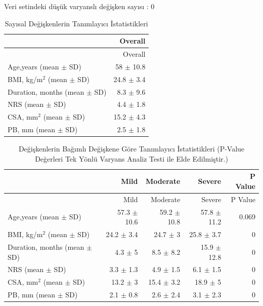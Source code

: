 \documentclass[12pt,twoside]{deuthesis}
\begin{document}
Veri setindeki düşük varyanslı değişken sayısı : 0
\begin{longtable}[]{@{}lr@{}}
\caption{\label{tab:deneme} Sayısal Değişkenlerin Tanımlayıcı İstatistikleri}\tabularnewline
\toprule
& Overall \\
\midrule
\endfirsthead
\toprule
& Overall \\
\midrule
\endhead
Age,years (mean \(\pm\) SD) & 58 \(\pm\) 10.8 \\
BMI, kg/m\(^2\) (mean \(\pm\) SD) & 24.8 \(\pm\) 3.4 \\
Duration, months (mean \(\pm\) SD) & 8.3 \(\pm\) 9.6 \\
NRS (mean \(\pm\) SD) & 4.4 \(\pm\) 1.8 \\
CSA, mm\(^2\) (mean \(\pm\) SD) & 15.2 \(\pm\) 4.3 \\
PB, mm (mean \(\pm\) SD) & 2.5 \(\pm\) 1.8 \\
\bottomrule
\end{longtable}
\begin{longtable}[]{@{}lrrrr@{}}
\caption{\label{tab:descrip} Değişkenlerin Bağımlı Değişkene Göre Tanımlayıcı İstatistikleri \tiny (P-Value Değerleri Tek Yönlü Varyans Analiz Testi ile Elde Edilmiştir.)}\tabularnewline
\toprule
& Mild & Moderate & Severe & P Value \\
\midrule
\endfirsthead
\toprule
& Mild & Moderate & Severe & P Value \\
\midrule
\endhead
Age,years (mean \(\pm\) SD) & 57.3 \(\pm\) 10.6 & 59.2 \(\pm\) 10.8 & 57.8 \(\pm\) 11.2 & 0.069 \\
BMI, kg/m\(^2\) (mean \(\pm\) SD) & 24.2 \(\pm\) 3.4 & 24.7 \(\pm\) 3 & 25.8 \(\pm\) 3.7 & 0 \\
Duration, months (mean \(\pm\) SD) & 4.3 \(\pm\) 5 & 8.5 \(\pm\) 8.2 & 15.9 \(\pm\) 12.8 & 0 \\
NRS (mean \(\pm\) SD) & 3.3 \(\pm\) 1.3 & 4.9 \(\pm\) 1.5 & 6.1 \(\pm\) 1.5 & 0 \\
CSA, mm\(^2\) (mean \(\pm\) SD) & 13.2 \(\pm\) 3 & 15.4 \(\pm\) 3.2 & 18.9 \(\pm\) 5 & 0 \\
PB, mm (mean \(\pm\) SD) & 2.1 \(\pm\) 0.8 & 2.6 \(\pm\) 2.4 & 3.1 \(\pm\) 2.3 & 0 \\
\bottomrule
\end{longtable}
\hfill\break
\hfill\break
~
\end{document}
